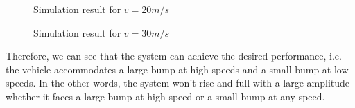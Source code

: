 \documentclass{article}
\begin{document}
\begin{figure}[htbp]
    \centering
    \caption{Simulation result for $v=20m/s$}
\end{figure}

\begin{figure}[htbp]
    \centering
    \caption{Simulation result for $v=30m/s$}
\end{figure}

Therefore,
we can see that the system can achieve the desired performance,
i.e. the vehicle accommodates a large bump at high speeds and a small bump at low speeds.
In the other words,
the system won't rise and full with a large amplitude whether it faces 
a large bump at high speed or a small bump at any speed.\\
\end{document}
